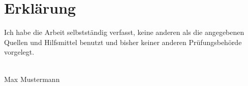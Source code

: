 \section*{Erklärung}
Ich habe die Arbeit selbstständig verfasst, keine anderen als die angegebenen Quellen und Hilfsmittel benutzt und bisher keiner anderen Prüfungsbehörde vorgelegt.

\vspace{55pt}

\null\hfill\parbox{8cm}{\hrulefill\\\centering Max Mustermann}